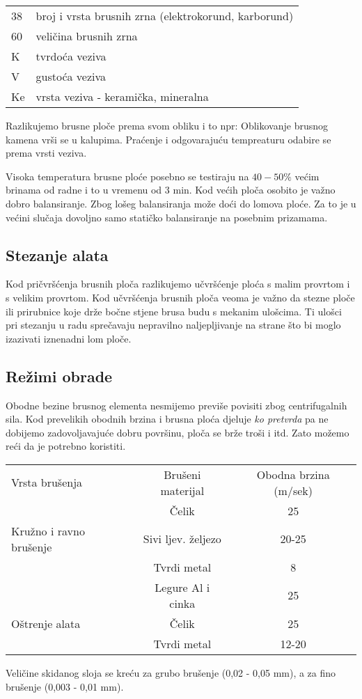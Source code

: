 \documentclass[a4paper,12pt]{article}
\numberwithin{figure}{section}
\begin{document}
\begin{table}[!h]
\centering
\begin{tabular}{ll}
38 & broj i vrsta brusnih zrna (elektrokorund, karborund) \\
60 & veličina brusnih zrna                                \\
K  & tvrdoća veziva                                       \\
V  & gustoća veziva                                       \\
Ke & vrsta veziva - keramička, mineralna                 
\end{tabular}
\end{table}
\FloatBarrier
Razlikujemo brusne ploče prema svom obliku i to npr:
Oblikovanje brusnog kamena vrši se u kalupima. Praćenje i odgovarajuću tempreaturu odabire se prema vrsti veziva.\par
Visoka temperatura brusne ploće posebno se testiraju na $40 - 50\%$ većim brinama od radne i to u vremenu od 3 min. Kod većih ploča osobito je važno dobro balansiranje. Zbog lošeg balansiranja može doći do lomova ploće. Za to je u većini slučaja dovoljno samo statičko balansiranje na posebnim prizamama.
\subsection{Stezanje alata}
Kod pričvršćenja brusnih ploča razlikujemo učvršćenje ploća s malim provrtom i s velikim provrtom.
Kod učvršćenja brusnih ploča veoma je važno da stezne ploče ili prirubnice koje drže bočne stjene brusa budu s mekanim ulošcima. Ti ulošci pri stezanju u radu sprečavaju nepravilno naljepljivanje na strane što bi moglo izazivati iznenadni lom ploče.
\subsection{Režimi obrade}
Obodne bezine brusnog elementa nesmijemo previše povisiti zbog centrifugalnih sila. Kod prevelikih obodnih brzina i brusna ploća djeluje \textit{ko pretvrda} pa ne dobijemo zadovoljavajuće dobru površinu, ploča se brže troši i itd. Zato možemo reći da je potrebno koristiti.
\begin{table}[!h]
\centering
\begin{tabular}{lcc}
Vrsta brušenja          & Brušeni materijal  & Obodna brzina (m/sek) \\
                        & Čelik              & 25                    \\
Kružno i ravno brušenje & Sivi ljev. željezo & 20-25                 \\
                        & Tvrdi metal        & 8                     \\
                        & Legure Al i cinka  & 25                    \\
Oštrenje alata          & Čelik              & 25                    \\
                        & Tvrdi metal        & 12-20                
\end{tabular}
\end{table}
\FloatBarrier
Veličine skidanog sloja se kreću za grubo brušenje (0,02 - 0,05 mm), a za fino brušenje (0,003 - 0,01 mm).
\end{document}
